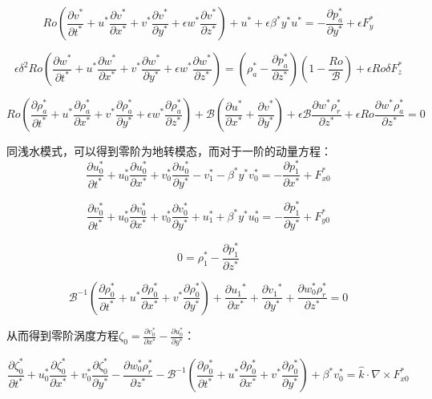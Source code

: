 \documentclass{article}
\begin{document}
$$Ro(\frac{\partial v^*}{\partial t^*} 
+ u^*\frac{\partial v^*}{\partial x^*}
+ v^*\frac{\partial v^*}{\partial y^*}
+ \epsilon w^*\frac{\partial v^*}{\partial z^*})
 + u^* + \epsilon \beta^*y^*u^* 
= -\frac{\partial p_a^* }{\partial y^*} + \epsilon F_y^*$$

$$\epsilon\delta^2Ro(\frac{\partial w^*}{\partial t^*} 
+ u^*\frac{\partial w^*}{\partial x^*}
+ v^*\frac{\partial w^*}{\partial y^*}
+ \epsilon w^*\frac{\partial w^*}{\partial z^*})
= (\rho_a^*-\frac{\partial p_a^* }{\partial z^*})(1-\frac{Ro}{\mathcal{B}}) + \epsilon Ro\delta F_z^*$$

$$Ro(\frac{\partial \rho_a^*}{\partial t^*} 
+ u^*\frac{\partial \rho_a^*}{\partial x^*}
+ v^*\frac{\partial \rho_a^*}{\partial y^*}
+ \epsilon w^*\frac{\partial \rho_a^*}{\partial z^*})
+ \mathcal{B}(\frac{\partial {{u}^{*}}}{\partial {{x}^{*}}}
+\frac{\partial {{v}^{*}}}{\partial {{y}^{*}}})
+ \epsilon\mathcal{B}\frac{\partial w^*\rho_r^*}{\partial z^*}
+ \epsilon Ro\frac{\partial w^*\rho_a^*}{\partial z^*}= 0$$

同浅水模式，可以得到零阶为地转模态，而对于一阶的动量方程：
$$\frac{\partial u_0^*}{\partial t^*} 
+ u_0^*\frac{\partial u_0^*}{\partial x^*}
+ v_0^*\frac{\partial u_0^*}{\partial y^*}
  - v_1^* - \beta^*y^*v_0^* 
= -\frac{\partial p_1^* }{\partial x^*} + F_{x0}^*$$

$$\frac{\partial v_0^*}{\partial t^*} 
+ u_0^*\frac{\partial v_0^*}{\partial x^*}
+ v_0^*\frac{\partial v_0^*}{\partial y^*}
 + u_1^* + \beta^*y^*u_0^* 
= -\frac{\partial p_1^* }{\partial y^*} + F_{y0}^*$$

$$0
=\rho_1^* -\frac{\partial p_1^* }{\partial z^*} $$

$$
\mathcal{B}^{-1}(\frac{\partial \rho_0^*}{\partial t^*} 
+ u^*\frac{\partial \rho_0^*}{\partial x^*}
+ v^*\frac{\partial \rho_0^*}{\partial y^*})
+ \frac{\partial {{u_1}^{*}}}{\partial {{x}^{*}}}
+\frac{\partial {{v_1}^{*}}}{\partial {{y}^{*}}}
+\frac{\partial w_0^*\rho_r^*}{\partial z^*}= 0$$

从而得到零阶涡度方程$\zeta_0 = \frac{\partial v_0^*}{\partial x^*}-
\frac{\partial u_0^*}{\partial y^*}$：

$$\frac{\partial \zeta_0^*}{\partial t^*} 
+ u_0^*\frac{\partial \zeta_0^*}{\partial x^*}
+ v_0^*\frac{\partial \zeta_0^*}{\partial y^*}
- \frac{\partial w_0^*\rho_r^*}{\partial z^*}
- \mathcal{B}^{-1}\left(\frac{\partial \rho_0^*}{\partial t^*} 
+ u^*\frac{\partial \rho_0^*}{\partial x^*}
+ v^*\frac{\partial \rho_0^*}{\partial y^*}\right)
+ \beta^*v_0^*
=  \hat{k}\cdot\nabla\times F_{x0}^*$$
\end{document}
